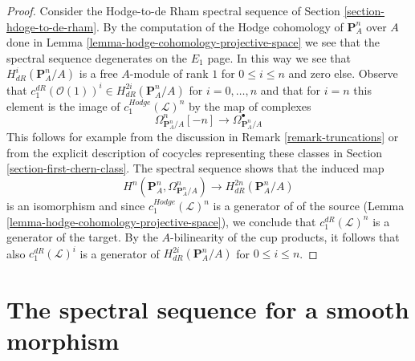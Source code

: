 \begin{proof}
Consider the Hodge-to-de Rham spectral sequence of
Section \ref{section-hdoge-to-de-rham}.
By the computation of the Hodge cohomology of $\mathbf{P}^n_A$ over $A$
done in Lemma \ref{lemma-hodge-cohomology-projective-space}
we see that the spectral sequence degenerates on the $E_1$ page.
In this way we see that $H^i_{dR}(\mathbf{P}^n_A/A)$ is a free
$A$-module of rank $1$ for $0 \leq i \leq n$ and zero else.
Observe that $c_1^{dR}(\mathcal{O}(1))^i \in H^{2i}_{dR}(\mathbf{P}^n_A/A)$
for $i = 0, \ldots, n$ and that for $i = n$ this element is the
image of $c_1^{Hodge}(\mathcal{L})^n$ by the map of complexes
$$
\Omega^n_{\mathbf{P}^n_A/A}[-n]
\longrightarrow
\Omega^\bullet_{\mathbf{P}^n_A/A}
$$
This follows for example from the discussion in Remark \ref{remark-truncations}
or from the explicit description of cocycles representing these classes in
Section \ref{section-first-chern-class}.
The spectral sequence shows that the induced map
$$
H^n(\mathbf{P}^n_A, \Omega^n_{\mathbf{P}^n_A/A}) \longrightarrow
H^{2n}_{dR}(\mathbf{P}^n_A/A)
$$
is an isomorphism and since $c_1^{Hodge}(\mathcal{L})^n$ is a generator of
of the source (Lemma \ref{lemma-hodge-cohomology-projective-space}),
we conclude that $c_1^{dR}(\mathcal{L})^n$ is a generator
of the target. By the $A$-bilinearity of the cup products,
it follows that also $c_1^{dR}(\mathcal{L})^i$
is a generator of $H^{2i}_{dR}(\mathbf{P}^n_A/A)$ for
$0 \leq i \leq n$.
\end{proof}









\section{The spectral sequence for a smooth morphism}
\label{section-relative-spectral-sequence}

